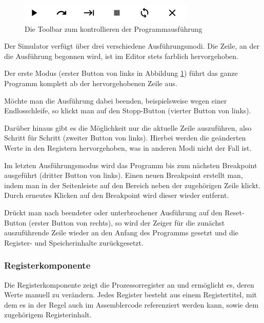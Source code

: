 \begin{figure}[ht]
	\centering
  \includegraphics[scale=1]{Images/Toolbar}
	\caption{Die Toolbar zum kontrollieren der Programmausführung}
	\label{Toolbar}
\end{figure}

Der Simulator verfügt über drei verschiedene Ausführungsmodi. Die Zeile, an der
die Ausführung begonnen wird, ist im Editor stets farblich hervorgehoben.

Der erste Modus (erster Button von links in Abbildung \ref{Toolbar}) führt das
ganze Programm komplett ab der hervorgehobenen Zeile aus.

Möchte man die Ausführung dabei beenden, beispielsweise wegen einer
Endlosschleife, so klickt man auf den Stopp-Button (vierter Button von links).

Darüber hinaus gibt es die Möglichkeit nur die aktuelle Zeile auszuführen, also
Schritt für Schritt (zweiter Button von links). Hierbei werden die geänderten
Werte in den Registern hervorgehoben, was in anderen Modi nicht der Fall ist.

Im letzten Ausführungsmodus wird das Programm bis zum nächsten Breakpoint
ausgeführt (dritter Button von links). Einen neuen Breakpoint erstellt man,
indem man in der Seitenleiste auf den Bereich neben der zugehörigen Zeile
klickt. Durch erneutes Klicken auf den Breakpoint wird dieser wieder entfernt.


Drückt man nach beendeter oder unterbrochener Ausführung auf den Reset-Button (erster
Button von rechts), so wird der Zeiger für die zunächst auszuführende Zeile wieder
an den Anfang des Programms gesetzt und die Register- und Speicherinhalte zurückgesetzt.


\subsubsection{Registerkomponente}
Die Registerkomponente zeigt die
Prozessorregister an und ermöglicht es, deren Werte manuell zu verändern. Jedes
Register besteht aus einem Registertitel, mit dem es in der Regel auch im
Assemblercode referenziert werden kann, sowie dem zugehörigem Registerinhalt.

